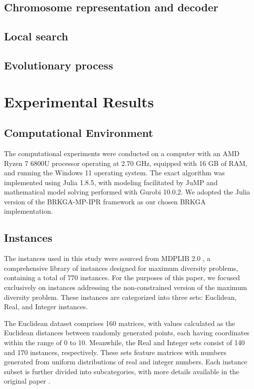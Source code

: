 \documentclass[preprint,12pt]{elsarticle}
\begin{document}
\subsection{Chromosome representation and decoder}
\subsection{Local search}
\subsection{Evolutionary process}


\section{Experimental Results}
\subsection{Computational Environment}
The computational experiments were conducted on a computer with an AMD Ryzen 7 6800U processor operating at 2.70 GHz, equipped with 16 GB of RAM, and running the Windows 11 operating system. The exact algorithm was implemented using Julia 1.8.5, with modeling facilitated by JuMP \cite{Lubin2023} and mathematical model solving performed with Gurobi 10.0.2. We adopted the Julia version of the BRKGA-MP-IPR framework \cite{Andrade2021-pe} as our chosen BRKGA implementation.

\subsection{Instances}
The instances used in this study were sourced from MDPLIB 2.0 \cite{marti2021mdplib}, a comprehensive library of instances designed for maximum diversity problems, containing a total of 770 instances. For the purposes of this paper, we focused exclusively on instances addressing the non-constrained version of the maximum diversity problem. These instances are categorized into three sets: Euclidean, Real, and Integer instances.

The Euclidean dataset comprises 160 matrices, with values calculated as the Euclidean distances between randomly generated points, each having coordinates within the range of 0 to 10. Meanwhile, the Real and Integer sets consist of 140 and 170 instances, respectively. These sets feature matrices with numbers generated from uniform distributions of real and integer numbers. Each instance subset is further divided into subcategories, with more details available in the original paper \cite{marti2021mdplib}.
\end{document}
